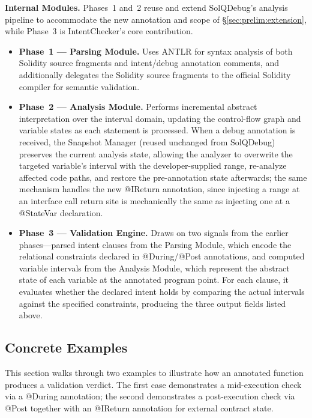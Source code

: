 \documentclass[pdflatex,sn-basic]{sn-jnl}%
\theoremstyle{thmstyleone}%
\theoremstyle{thmstyletwo}%
\theoremstyle{thmstylethree}%
\begin{document}
\smallskip
\noindent\textbf{Internal Modules.}
Phases~1 and~2 reuse and extend SolQDebug's analysis pipeline to accommodate the new annotation and scope of §\ref{sec:prelim:extension}, while Phase~3 is IntentChecker's core contribution.
\begin{itemize}
    \item \textbf{Phase~1 --- Parsing Module.} Uses ANTLR for syntax analysis of both Solidity source fragments and intent/debug annotation comments, and additionally delegates the Solidity source fragments to the official Solidity compiler for semantic validation.
    \item \textbf{Phase~2 --- Analysis Module.} Performs incremental abstract interpretation over the interval domain, updating the control-flow graph and variable states as each statement is processed. When a debug annotation is received, the Snapshot Manager (reused unchanged from SolQDebug) preserves the current analysis state, allowing the analyzer to overwrite the targeted variable's interval with the developer-supplied range, re-analyze affected code paths, and restore the pre-annotation state afterwards; the same mechanism handles the new @IReturn annotation, since injecting a range at an interface call return site is mechanically the same as injecting one at a @StateVar declaration.
    \item \textbf{Phase~3 --- Validation Engine.} Draws on two signals from the earlier phases---parsed intent clauses from the Parsing Module, which encode the relational constraints declared in @During/@Post annotations, and computed variable intervals from the Analysis Module, which represent the abstract state of each variable at the annotated program point. For each clause, it evaluates whether the declared intent holds by comparing the actual intervals against the specified constraints, producing the three output fields listed above.
\end{itemize}

\subsection{Concrete Examples}

This section walks through two examples to illustrate how an annotated function produces a validation verdict.
The first case demonstrates a mid-execution check via a @During annotation; the second demonstrates a post-execution check via @Post together with an @IReturn annotation for external contract state.
\end{document}
